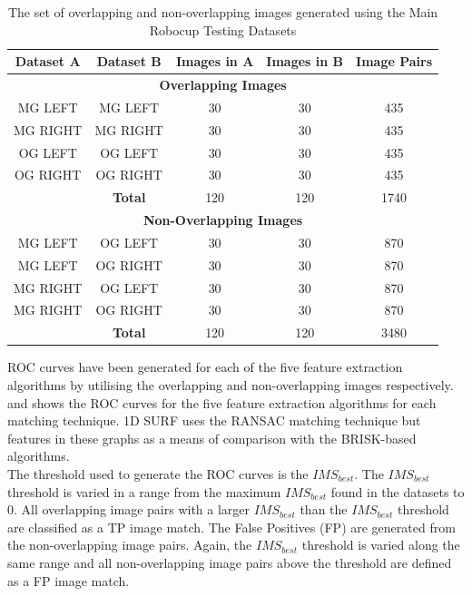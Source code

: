 \begin{table}
\centering
\caption{The set of overlapping and non-overlapping images generated using
the Main Robocup Testing Datasets}
\begin{tabular}{|c|c|c|c|c|}
\hline 
\textbf{Dataset A} & \textbf{Dataset B} & \textbf{Images in A} & \textbf{Images in B} & \textbf{Image Pairs}\tabularnewline
\hline 
\hline 
\multicolumn{5}{|c|}{\textbf{Overlapping Images}}\tabularnewline
\hline 
MG LEFT & MG LEFT & 30 & 30 & 435\tabularnewline
\hline 
MG RIGHT & MG RIGHT & 30 & 30 & 435\tabularnewline
\hline 
OG LEFT & OG LEFT & 30 & 30 & 435\tabularnewline
\hline 
OG RIGHT & OG RIGHT & 30 & 30 & 435\tabularnewline
\hline 
 & \textbf{Total} & 120 & 120 & 1740\tabularnewline
\hline 
\multicolumn{5}{|c|}{\textbf{Non-Overlapping Images}}\tabularnewline
\hline 
MG LEFT & OG LEFT & 30 & 30 & 870\tabularnewline
\hline 
MG LEFT & OG RIGHT & 30 & 30 & 870\tabularnewline
\hline 
MG RIGHT & OG LEFT & 30 & 30 & 870\tabularnewline
\hline 
MG RIGHT & OG RIGHT & 30 & 30 & 870\tabularnewline
\hline 
 & \textbf{Total} & 120 & 120 & 3480\tabularnewline
\hline 
\end{tabular}
\label{tab:mrtd}
\end{table}

ROC curves have been generated for each of the five feature extraction algorithms by utilising the overlapping and non-overlapping images respectively.  and  shows the ROC curves for the five feature extraction algorithms for each matching technique. 1D SURF uses the RANSAC matching technique but features in these graphs as a means of comparison with the BRISK-based algorithms.\\

The threshold used to generate the ROC curves is the $IMS_{best}$. The $IMS_{best}$ threshold is varied in a range from the maximum $IMS_{best}$ found in the datasets to $0$.  All overlapping image pairs with a larger $IMS_{best}$ than the $IMS_{best}$ threshold are classified as a TP image match. The False Positives (FP) are generated from the non-overlapping image pairs. Again, the $IMS_{best}$ threshold is varied along the same range and all non-overlapping image pairs above the threshold are defined as a FP image match. \\


